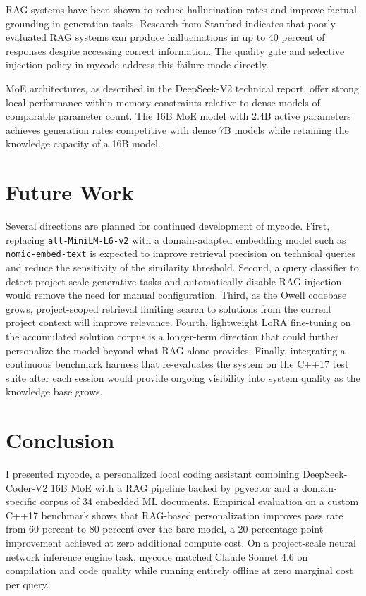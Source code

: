 \documentclass[11pt,twocolumn]{article}
\begin{document}
RAG systems have been shown to reduce hallucination rates and improve factual
grounding in generation tasks. Research from Stanford indicates that poorly
evaluated RAG systems can produce hallucinations in up to 40 percent of
responses despite accessing correct information. The quality gate and selective
injection policy in mycode address this failure mode directly.

MoE architectures, as described in the DeepSeek-V2 technical report, offer
strong local performance within memory constraints relative to dense models of
comparable parameter count. The 16B MoE model with 2.4B active parameters
achieves generation rates competitive with dense 7B models while retaining
the knowledge capacity of a 16B model.

\section{Future Work}

Several directions are planned for continued development of mycode. First,
replacing \texttt{all-MiniLM-L6-v2} with a domain-adapted embedding model
such as \texttt{nomic-embed-text} is expected to improve retrieval precision
on technical queries and reduce the sensitivity of the similarity threshold.
Second, a query classifier to detect project-scale generative tasks and
automatically disable RAG injection would remove the need for manual
configuration. Third, as the Owell codebase grows, project-scoped retrieval
limiting search to solutions from the current project context will improve
relevance. Fourth, lightweight LoRA fine-tuning on the accumulated solution
corpus is a longer-term direction that could further personalize the model
beyond what RAG alone provides. Finally, integrating a continuous benchmark
harness that re-evaluates the system on the C++17 test suite after each
session would provide ongoing visibility into system quality as the knowledge
base grows.

\section{Conclusion}

I presented mycode, a personalized local coding assistant combining
DeepSeek-Coder-V2 16B MoE with a RAG pipeline backed by pgvector and a
domain-specific corpus of 34 embedded ML documents. Empirical evaluation on
a custom C++17 benchmark shows that RAG-based personalization improves pass
rate from 60 percent to 80 percent over the bare model, a 20 percentage point
improvement achieved at zero additional compute cost. On a project-scale
neural network inference engine task, mycode matched Claude Sonnet 4.6 on
compilation and code quality while running entirely offline at zero marginal
cost per query.
\end{document}
